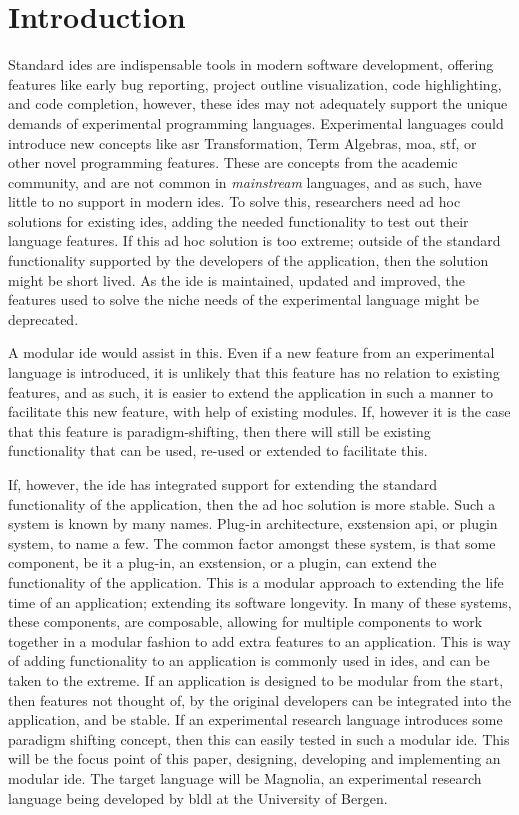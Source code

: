 \chapter{Introduction}

Standard \gls{ide}s are indispensable tools in modern software development,
offering features like early bug reporting, project outline visualization, code
highlighting, and code completion, however, these \gls{ide}s may not adequately
support the unique demands of experimental programming languages. Experimental
languages could introduce new concepts like \gls{asr} Transformation, Term
Algebras, \gls{moa}, \gls{stf}, or other novel programming features. These are
concepts from the academic community, and are not common in \textit{mainstream}
languages, and as such, have little to no support in modern \gls{ide}s. To solve
this, researchers need ad hoc solutions for existing \gls{ide}s, adding the
needed functionality to test out their language features. If this ad hoc
solution is too extreme; outside of the standard functionality supported by the
developers of the application, then the solution might be short lived. As the
\gls{ide} is maintained, updated and improved, the features used to solve the
niche needs of the experimental language might be deprecated.

A modular \gls{ide} would assist in this. Even if a new feature from an
experimental language is introduced, it is unlikely that this feature has no
relation to existing features, and as such, it is easier to extend the
application in such a manner to facilitate this new feature, with help of
existing modules.
If, however it is the case that this feature is paradigm-shifting, then there
will still be existing functionality that can be used, re-used or extended to
facilitate this.

If, however, the \gls{ide} has integrated support for extending the standard
functionality of the application, then the ad hoc solution is more stable. Such
a system is known by many names. Plug-in architecture, exstension \gls{api}, or
plugin system, to name a few. The common factor amongst these system, is that
some component, be it a plug-in, an exstension, or a plugin, can extend the
functionality of the application. This is a modular approach to extending the
life time of an application; extending its software longevity. In many of these
systems, these components, are composable, allowing for multiple components to
work together in a modular fashion to add extra features to an application. This
is way of adding functionality to an application is commonly used in \gls{ide}s,
and can be taken to the extreme. If an application is designed to be modular
from the start, then features not thought of, by the original developers can be
integrated into the application, and be stable. If an experimental research
language introduces some paradigm shifting concept, then this can easily tested
in such a modular \gls{ide}. This will be the focus point of this paper,
designing, developing and implementing an modular \gls{ide}. The target language
will be Magnolia, an experimental research language being developed by
\gls{bldl} at the University of Bergen.

